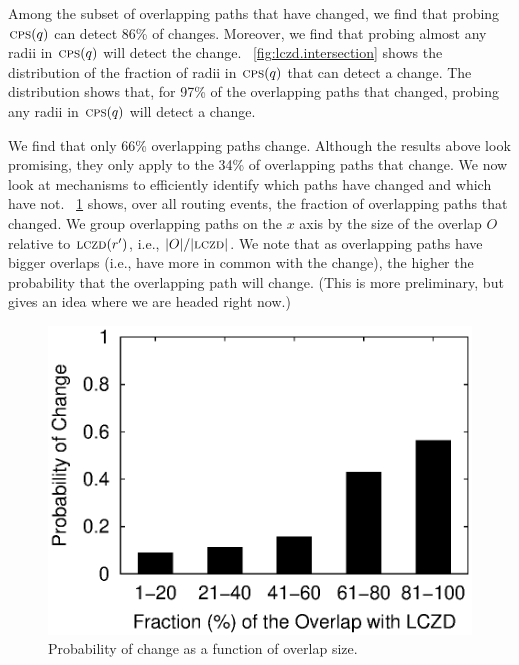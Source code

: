 
Among the subset of overlapping paths that have changed, we find
that probing $\mathrm{\textsc{cps}}(q)$ can detect 86\% of changes.  Moreover, we
find that probing almost any radii in $\mathrm{\textsc{cps}}(q)$ will detect the
change.  \figstr~\ref{fig:lczd.intersection} shows the distribution
of the fraction of radii in $\mathrm{\textsc{cps}}(q)$ that can detect a change.  The
distribution shows that, for 97\% of the overlapping paths that
changed, probing any radii in $\mathrm{\textsc{cps}}(q)$ will detect a change.

  We find that only 66\%
overlapping paths change.  Although the results above look
promising, they only apply to the 34\% of overlapping paths that
change.  We now look at mechanisms to efficiently identify which
paths have changed and which have not.
\figstr~\ref{fig:overlap.change.prob} shows, over all routing
events, the fraction of overlapping paths that changed.  We group
overlapping paths on the $x$ axis by the size of the overlap $O$
relative to $\mathrm{\textsc{lczd}}(r')$, i.e., $|O|/|\mathrm{\textsc{lczd}}|$.  We note that as
overlapping paths have bigger overlaps (i.e., have more in common
with the change), the higher the probability that the overlapping
path will change.  (This is more preliminary, but gives an idea
where we are headed right now.)


\begin{figure}
\begin{center}
\includegraphics[width=1.05\columnwidth]{figs/patching/probchange/probchange.eps}
\caption{Probability of change as a function of overlap size.}
\label{fig:overlap.change.prob}
\end{center}
\end{figure}

